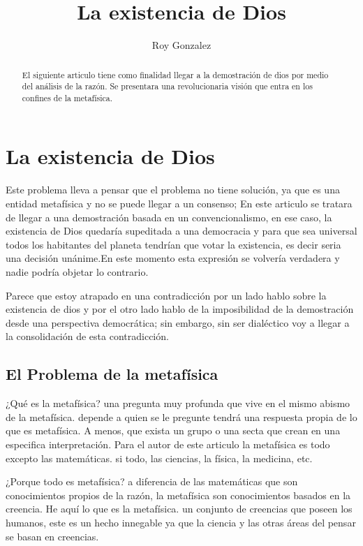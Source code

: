 \documentclass[12pt,letterpaper, a4paper ]{article}
\title{\Huge{La existencia de Dios}}
\author{Roy Gonzalez}
\begin{document}
\maketitle

\begin{abstract}
El siguiente articulo tiene como finalidad llegar a la demostración de dios por medio del análisis de la razón. Se presentara una revolucionaria visión que entra en los confines de la metafísica.
\end{abstract}

\section{La existencia de Dios}
Este problema lleva a pensar que el problema no tiene solución, ya que es una entidad metafísica y no se puede llegar a un consenso; En este articulo se tratara de llegar a una demostración basada en 
un convencionalismo, en ese caso, la existencia de Dios quedaría supeditada a una democracia y para que sea universal todos los habitantes del planeta tendrían que votar la existencia, es decir seria una decisión unánime.En este momento esta expresión se volvería verdadera y nadie podría objetar lo contrario.


Parece que estoy atrapado en una contradicción por un lado hablo sobre la existencia de dios y por el otro lado hablo de la imposibilidad de la demostración desde una perspectiva democrática; sin embargo, sin ser dialéctico voy a llegar a la consolidación de esta contradicción.


\subsection{El Problema de la metafísica}
¿Qué es la metafísica? una pregunta muy profunda que vive en el mismo abismo de la metafísica. depende a quien se le pregunte tendrá una respuesta propia de lo que es metafísica. A menos, que exista un grupo o una secta que crean en una especifica interpretación. Para el autor de este articulo la metafísica es todo excepto las matemáticas. si todo, las ciencias, la física, la medicina, etc.
 
 ¿Porque todo es metafísica? a diferencia de las matemáticas que son conocimientos propios de la razón, la metafísica son conocimientos basados en la creencia. He aquí lo que es la metafísica. un conjunto de creencias que poseen los humanos, este es un hecho innegable ya que la ciencia y las otras áreas del pensar se basan en creencias.
 
\end{document}
